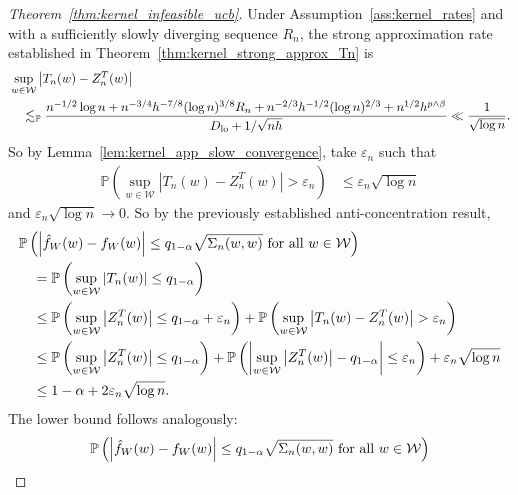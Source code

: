 \documentclass[11pt,lof]{puthesis}
\renewcommand{\P}{\ensuremath{\mathbb{P}}}
\newcommand{\cW}{\ensuremath{\mathcal{W}}}
\newcommand{\Dl}{\ensuremath{D_{\textup{lo}}}}
\theoremstyle{break}
\theoremstyle{proof}
\newtheorem{proof}{Proof}
\begin{document}
\begin{proof}[Theorem~\ref{thm:kernel_infeasible_ucb}]
  Under Assumption~\ref{ass:kernel_rates} and with a
  sufficiently slowly diverging sequence $R_n$,
  the strong approximation rate established in
  Theorem~\ref{thm:kernel_strong_approx_Tn} is
  \begin{align*}
    &\sup_{w \in \cW} \left| T_n(w) - Z_n^T(w) \right| \\
    &\quad\lesssim_\P
    \frac{
      n^{-1/2} \log n
      + n^{-3/4} h^{-7/8} (\log n)^{3/8} R_n
      + n^{-2/3} h^{-1/2} (\log n)^{2/3}
    + n^{1/2} h^{p \wedge \beta}}
    {\Dl + 1/\sqrt{n h}}
    \ll \frac{1}{\sqrt{\log n}}.
  \end{align*}
  So by Lemma~\ref{lem:kernel_app_slow_convergence}, take $\varepsilon_n$ such
  that
  \begin{align*}
    \P \left(
      \sup_{w \in \cW} \left| T_n(w) - Z_n^T(w) \right|
      > \varepsilon_n
    \right)
    &\leq
    \varepsilon_n \sqrt{\log n}
  \end{align*}
  and $\varepsilon_n \sqrt{\log n} \to 0$.
  So by the previously established anti-concentration result,
  \begin{align*}
    &\P\left(
      \left|
      \hat f_W(w) - f_W(w)
      \right|
      \leq
      q_{1-\alpha}
      \sqrt{\Sigma_n(w,w)}
      \textup{ for all }
      w \in \cW
    \right) \\
    &\quad=
    \P\left(
      \sup_{w \in \cW}
      \left| T_n(w) \right|
      \leq
      q_{1-\alpha}
    \right) \\
    &\quad\leq
    \P\left(
      \sup_{w \in \cW}
      \left| Z_n^T(w) \right|
      \leq
      q_{1-\alpha}
      + \varepsilon_n
    \right)
    + \P \left(
      \sup_{w \in \cW} \left| T_n(w) - Z_n^T(w) \right|
      > \varepsilon_n
    \right) \\
    &\quad\leq
    \P\left(
      \sup_{w \in \cW}
      \left|
      Z_n^T(w)
      \right|
      \leq
      q_{1-\alpha}
    \right)
    + \P\left(
      \left|
      \sup_{w \in \cW}
      \big| Z_n^T(w) \big|
      - q_{1-\alpha}
      \right|
      \leq \varepsilon_n
    \right)
    + \varepsilon_n \sqrt{\log n} \\
    &\quad\leq
    1 - \alpha
    + 2 \varepsilon_n \sqrt{\log n}.
  \end{align*}
  The lower bound follows analogously:
  \begin{align*}
    &\P\left(
      \left|
      \hat f_W(w) - f_W(w)
      \right|
      \leq
      q_{1-\alpha}
      \sqrt{\Sigma_n(w,w)}
      \textup{ for all }
      w \in \cW
    \right) \\

\end{align*}
\end{proof}
\end{document}
